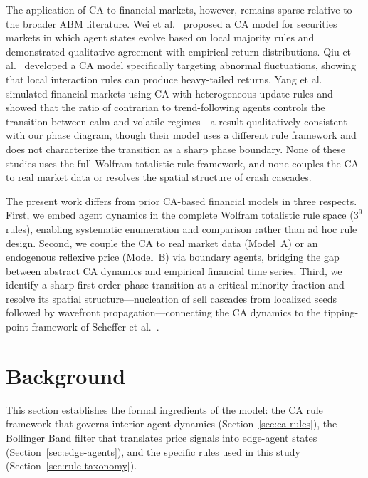 \documentclass{article}
\theoremstyle{definition}
\theoremstyle{remark}
\begin{document}
The application of CA to financial markets, however, remains sparse relative to the broader
ABM literature. Wei et al.~\cite{wei2003cellular} proposed a CA model for securities markets
in which agent states evolve based on local majority rules and demonstrated qualitative
agreement with empirical return distributions. Qiu et al.~\cite{qiu2007cellular} developed a
CA model specifically targeting abnormal fluctuations, showing that local interaction rules
can produce heavy-tailed returns. Yang et al.~\cite{yang2019financial} simulated financial
markets using CA with heterogeneous update rules and showed that the ratio of contrarian to
trend-following agents controls the transition between calm and volatile regimes---a result
qualitatively consistent with our phase diagram, though their model uses a different rule
framework and does not characterize the transition as a sharp phase boundary. None of these
studies uses the full Wolfram totalistic rule framework, and none couples the CA to real
market data or resolves the spatial structure of crash cascades.

The present work differs from prior CA-based financial models in three respects. First, we
embed agent dynamics in the complete Wolfram totalistic rule space ($3^9$ rules), enabling
systematic enumeration and comparison rather than ad hoc rule design. Second, we couple the
CA to real market data (Model~A) or an endogenous reflexive price (Model~B) via boundary
agents, bridging the gap between abstract CA dynamics and empirical financial time series.
Third, we identify a sharp first-order phase transition at a critical minority fraction and
resolve its spatial structure---nucleation of sell cascades from localized seeds followed by
wavefront propagation---connecting the CA dynamics to the tipping-point framework of
Scheffer et al.~\cite{scheffer2009early}.


\section{Background}
\label{sec:background}

This section establishes the formal ingredients of the model: the CA rule framework that
governs interior agent dynamics (Section~\ref{sec:ca-rules}), the Bollinger Band filter
that translates price signals into edge-agent states (Section~\ref{sec:edge-agents}), and
the specific rules used in this study (Section~\ref{sec:rule-taxonomy}).
\end{document}
